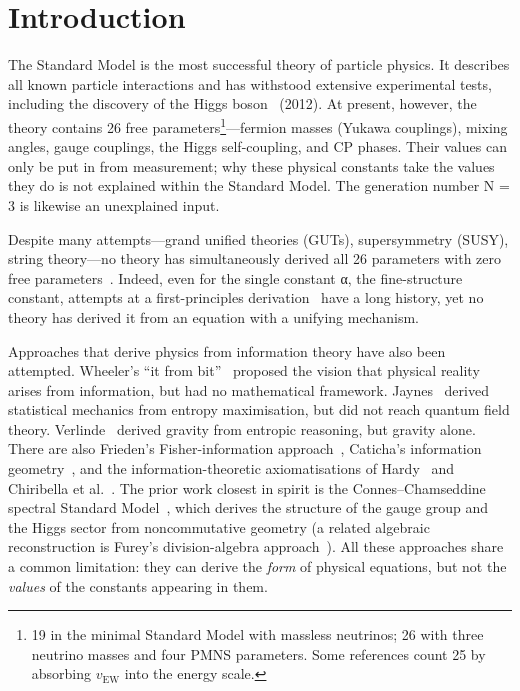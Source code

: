 \documentclass[12pt,a4paper]{article}
\begin{document}
\section{Introduction}

The Standard Model is the most successful theory of particle physics. It describes all known particle interactions and has withstood extensive experimental tests, including the discovery of the Higgs boson~\cite{atlas,cms} (2012). At present, however, the theory contains 26 free parameters\footnote{19 in the minimal Standard Model with massless neutrinos; 26 with three neutrino masses and four PMNS parameters. Some references count 25 by absorbing $v_\mathrm{EW}$ into the energy scale.}---fermion masses (Yukawa couplings), mixing angles, gauge couplings, the Higgs self-coupling, and CP phases. Their values can only be put in from measurement; why these physical constants take the values they do is not explained within the Standard Model. The generation number N = 3 is likewise an unexplained input.

Despite many attempts---grand unified theories (GUTs), supersymmetry (SUSY), string theory---no theory has simultaneously derived all 26 parameters with zero free parameters~\cite{xing}. Indeed, even for the single constant α, the fine-structure constant, attempts at a first-principles derivation~\cite{eddington,wyler,jentschura} have a long history, yet no theory has derived it from an equation with a unifying mechanism.

Approaches that derive physics from information theory have also been attempted. Wheeler's ``it from bit''~\cite{wheeler} proposed the vision that physical reality arises from information, but had no mathematical framework. Jaynes~\cite{jaynes} derived statistical mechanics from entropy maximisation, but did not reach quantum field theory. Verlinde~\cite{verlinde} derived gravity from entropic reasoning, but gravity alone. There are also Frieden's Fisher-information approach~\cite{frieden}, Caticha's information geometry~\cite{caticha}, and the information-theoretic axiomatisations of Hardy~\cite{hardy} and Chiribella et al.~\cite{chiribella}. The prior work closest in spirit is the Connes–Chamseddine spectral Standard Model~\cite{connes96,chamconnes96,ccm07}, which derives the structure of the gauge group and the Higgs sector from noncommutative geometry (a related algebraic reconstruction is Furey's division-algebra approach~\cite{furey}). All these approaches share a common limitation: they can derive the \emph{form} of physical equations, but not the \emph{values} of the constants appearing in them.
\end{document}
